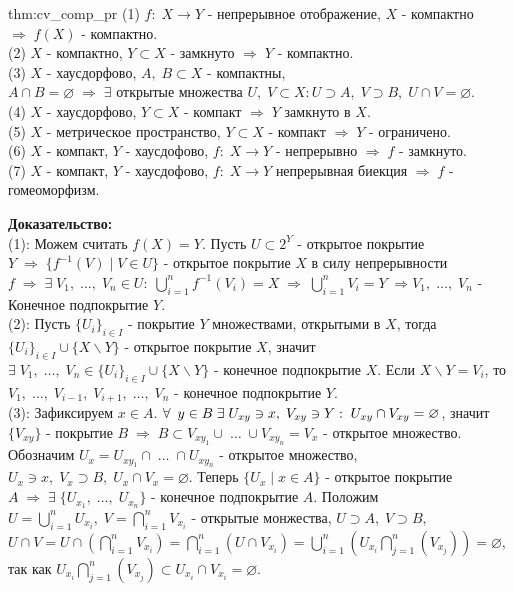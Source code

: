 \documentclass[../../main.tex]{subfiles}
\begin{document}
\begin{theo}{thm:cv_comp_pr}
(1) $f:\;X\rightarrow Y$ - непрерывное отображение, $X$ - компактно $\Rightarrow\; f(X)$ - компактно.\\
(2) $X$ - компактно, $Y\subset X$ - замкнуто $\Rightarrow\; Y$ - компактно.\\
(3) $X$ - хаусдорфово, $A,\;B\subset X$ -  компактны, $A\cap B = \varnothing\; \Rightarrow\; \exists \text{ открытые множества } U,\; V \subset X: U\supset A,\; V\supset B,\; U\cap V = \varnothing$.\\
(4) $X$ - хаусдорфово, $Y\subset X$ - компакт $\Rightarrow\; Y$ замкнуто в $X$.\\
(5) $X$ - метрическое пространство, $Y\subset X$ - компакт $\Rightarrow\; Y$ - ограничено.\\
(6) $X$ - компакт, $Y$ - хаусдофово, $f:\;X\rightarrow Y$ - непрерывно $\Rightarrow\; f$ - замкнуто.\\
(7) $X$ - компакт, $Y$ - хаусдофово, $f:\;X\rightarrow Y$ непрерывная биекция $\Rightarrow\; f$ - гомеоморфизм.
\end{theo}
\textbf{Доказательство:}\\
(1): Можем считать $f(X)=Y$. Пусть $U\subset 2^Y$ - открытое покрытие $Y\; \Rightarrow\; \{f^{-1}(V)\; | \; V \in U\}$ - открытое покрытие $X$ в силу непрерывности $f\;\Rightarrow\; \exists\; V_1,\; \ldots ,\; V_n\in U:\; \bigcup\limits_{i=1}^n f^{-1}(V_i) = X\; \Rightarrow\; \bigcup\limits_{i=1}^n V_i = Y\;\Rightarrow {V_1,\; \ldots ,\; V_n}$ - Конечное подпокрытие $Y$.\\
(2): Пусть $\{U_i\}_{i\in I}$ -  покрытие $Y$ множествами, открытыми в $X$, тогда $\{U_i\}_{i\in I}\cup \{X\backslash Y\}$ -  открытое покрытие $X$, значит $\exists\; V_1,\; \ldots ,\;V_n\in \{U_i\}_{i\in I}\cup \{X\backslash Y\}$ - конечное подпокрытие $X$. Если $X\backslash Y = V_i$, то $V_1,\; \ldots ,\;V_{i-1},\;V_{i+1},\; \ldots ,\;V_n$ - конечное подпокрытие $Y$.\\
(3): Зафиксируем $x\in A$. $\forall\:\; y\in B\; \exists\; U_{xy}\ni x,\; V_{xy}\ni Y:\; U_{xy}\cap V_{xy} = \varnothing$, значит $\{V_{xy}\}$ - покрытие $B\; \Rightarrow\; B\subset V_{xy_1}\cup\; \ldots \;\cup V_{xy_n}=V_x$ - открытое множество. Обозначим $U_x = U_{xy_1}\cap\; \ldots \;\cap U_{xy_n}$ - открытое множество, $U_x \ni x,\; V_x\supset B,\; U_x\cap V_x = \varnothing$. Теперь $\{U_x\; |\; x\in A\}$ - открытое покрытие $A\; \Rightarrow\;\exists\; \{U_{x_1},\; \ldots ,\;U_{x_n}\}$ - конечное подпокрытие $A$. Положим $U= \bigcup\limits_{i=1}^n U_{x_i},\; V = \bigcap\limits_{i=1}^n V_{x_i}$ - открытые монжества, $U\supset A,\; V\supset B,$ $ U\cap V =U\cap (\bigcap\limits_{i=1}^n V_{x_i})=\bigcap\limits_{i=1}^n(U\cap V_{x_i})=  \bigcup\limits_{i=1}^n(U_{x_i}\bigcap\limits_{j=1}^n(V_{x_j})) =\varnothing$, так как $U_{x_i}\bigcap\limits_{j=1}^n(V_{x_j})\subset U_{x_i}\cap V_{x_i} = \varnothing$.\\
\end{document}
